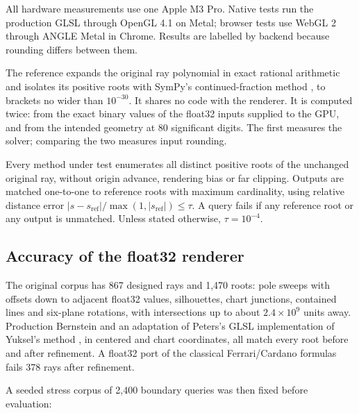\documentclass{jcgt}
\begin{document}
All hardware measurements use one Apple M3 Pro. Native tests run the
production GLSL through OpenGL 4.1 on Metal; browser tests use WebGL 2
through ANGLE Metal in Chrome. Results are labelled by backend because
rounding differs between them.

The reference expands the original ray polynomial in exact rational
arithmetic and isolates its positive roots with SymPy's
continued-fraction method \citep{meurer2017}, to brackets no wider than
\(10^{-30}\). It shares no code with the renderer. It is computed twice:
from the exact binary values of the float32 inputs supplied to the GPU,
and from the intended geometry at 80 significant digits. The first
measures the solver; comparing the two measures input rounding.

Every method under test enumerates all distinct positive roots of the
unchanged original ray, without origin advance, rendering bias or far
clipping. Outputs are matched one-to-one to reference roots with maximum
cardinality, using relative distance error
\(|s-s_{\mathrm{ref}}|/\max(1,|s_{\mathrm{ref}}|)\le\tau\). A query
fails if any reference root or any output is unmatched. Unless stated
otherwise, \(\tau=10^{-4}\).

\subsection{Accuracy of the float32
renderer}\label{accuracy-of-the-float32-renderer}

The original corpus has 867 designed rays and 1,470 roots: pole sweeps
with offsets down to adjacent float32 values, silhouettes, chart
junctions, contained lines and six-plane rotations, with intersections
up to about \(2.4\times10^9\) units away. Production Bernstein and an
adaptation of Peters's GLSL implementation \citep{peters2023} of
Yuksel's method \citep{yuksel2022}, in centered and chart coordinates,
all match every root before and after refinement. A float32 port of the
classical Ferrari/Cardano formulas fails 378 rays after refinement.

A seeded stress corpus of 2,400 boundary queries was then fixed before
evaluation:
\end{document}
